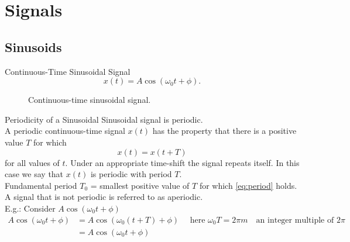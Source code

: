 \section{Signals}

\subsection{Sinusoids}

\begin{frame}[plain]{Continuous-Time Sinusoidal Signal}
    \begin{equation}\label{eq:cosine}
        x(t) = A\cos(\omega_0 t + \phi).
    \end{equation}


    \begin{figure}
        \centering
        
        \caption{Continuous-time sinusoidal signal.}\label{fi:cosine}
    \end{figure}
\end{frame}

\begin{frame}[plain]{Periodicity of a Sinusoidal}
    Sinusoidal signal is \alert{periodic}.\\
    A periodic continuous-time signal $x(t)$ has the property that  there is a positive value $T$ for which
    \begin{equation}\label{eq:period}
        x(t) = x(t+T)
    \end{equation}
    for all values of $t$. Under an appropriate time-shift the signal repeats itself. In this case we say that $x(t)$ is periodic with period $T$.\\
    \alert{Fundamental period $T_0$} = smallest positive value of $T$ for which \ref{eq:period} holds.\\
    A signal that is not periodic is referred to as \alert{aperiodic}. \\
    E.g.: Consider $A\cos(\omega_0t + \phi)$\\
    \begin{equation*}
        \begin{split}
            A\cos(\omega_0t + \phi) &= A\cos(\omega_0(t + T) + \phi)\quad \text{ here } \omega_0T = 2\pi m \quad \text{an integer multiple of } 2\pi\\
                                    &= A\cos(\omega_0t + \phi)\\
        \end{split}
    \end{equation*}

\end{frame}


